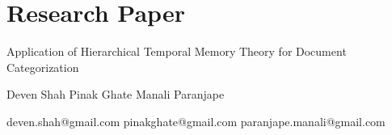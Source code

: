 \documentclass[12pt]{article}
\begin{document}
\section{Research Paper}
\begin{huge}
\begin{center}
Application of Hierarchical Temporal Memory Theory for Document Categorization
\end{center}
\end{huge}
\vspace{0.2cm}
\begin{center}
\begin{Large}
Deven Shah \hspace{2cm} Pinak Ghate \hspace{2cm} Manali Paranjape\\
\end{Large}
deven.shah@gmail.com \hspace{0.5} pinakghate@gmail.com \hspace{0.5cm} paranjape.manali@gmail.com
\end{center}
\end{document}

